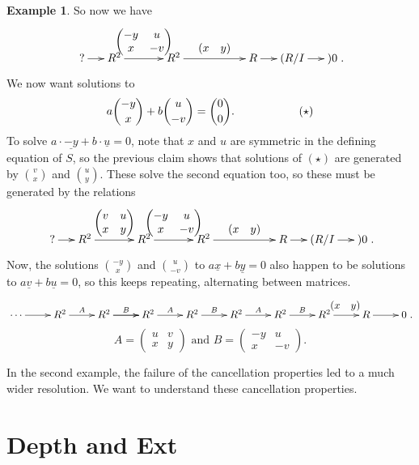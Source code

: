\documentclass[11pt]{book}
\numberwithin{equation}{section}
\numberwithin{theorem}{chapter}
\theoremstyle{definition}
\newtheorem{example}[theorem]{Example}
\newtheorem*{basic properties}{Basic Properties}
\newtheorem*{Important Remark}{Important Remark}
\theoremstyle{remark}
\begin{document}
\begin{example}
So now we have
$$\xymatrix@C=5mm{? \ar[r] & R^2 \ar[rr]^{\begin{pmatrix} -y & u \\ x & -v \end{pmatrix}} && R^2 \ar[rrr]^-{\begin{array}{cc} (x & y) \end{array}} &&& R \ar[r] & (R/I \ar[r] &) 0}.$$
We now want solutions to
$$a {-y \choose x} + b {u \choose -v} = {0 \choose 0}. \hskip 20mm (\star)$$	
To solve
$a \cdot \underline{-y} + b \cdot \underline{u} = 0$, note that $x$ and $u$ are symmetric in the defining equation of $S$, so the previous claim shows that solutions of $(\star)$ are generated by ${v \choose x}$ and ${u \choose y}$. These solve the second equation too, so these must be generated by the relations
$$\xymatrix@C=5mm{? \ar[r] & R^2 \ar[rr]^{\begin{pmatrix} v & u \\ x & y \end{pmatrix}} && R^2 \ar[rr]^{\begin{pmatrix} -y & u \\ x & -v \end{pmatrix}} && R^2 \ar[rrr]^-{\begin{array}{cc} (x & y) \end{array}} &&& R \ar[r] & (R/I \ar[r] &) 0}.$$
Now, the solutions ${-y \choose x}$ and ${u \choose -v}$ to $a\underline{x}+b\underline{y} = 0$ also happen to be solutions to $a\underline{v}+b\underline{u} = 0$, so
this keeps repeating, alternating between matrices.
$$\xymatrix{\cdots \ar[r] & R^2 \ar[r]^{A} & R^2 \ar[r]^{B} \ar[r] & R^2 \ar[r]^{A} & R^2 \ar[r]^{B} & R^2 \ar[r]^{A} & R^2 \ar[r]^{B} & R^2 \ar[r]^{\begin{array}{cc} (x & y) \end{array}} & R \ar[r] & 0}.$$
$$A = \left( \begin{array}{cc} u & v \\ x & y  \end{array} \right) \textrm{ and } B = \left( \begin{array}{cc} -y & u \\ x & -v \end{array} \right).$$
\end{example}


In the second example, the failure of the cancellation properties led to a much wider resolution. We want to understand these cancellation properties.

\section{Depth and Ext}
\end{document}
